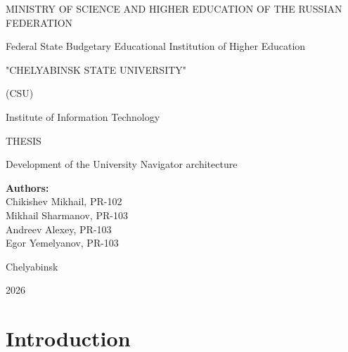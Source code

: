 \documentclass[a4paper, 14pt]{extreport}
\begin{document}
\begin{titlepage}
	\centering
	{MINISTRY OF SCIENCE AND HIGHER EDUCATION OF THE RUSSIAN FEDERATION \par}
	{\normalsize Federal State Budgetary Educational Institution of Higher Education \par}
	{"CHELYABINSK STATE UNIVERSITY" \par}
	(CSU) \par
	\vspace{5pt}
	{\normalsize Institute of Information Technology \par}

	\vspace{80pt}

	{\large THESIS \par}
	\vspace{20pt}

	{\Large Development of the University Navigator architecture \par}

	\vspace{60pt}

	\begin{flushright}
		\begin{minipage}{0.45\textwidth}
			{\bfseries Authors:} \\
			Chikishev Mikhail, PR-102\\
			Mikhail Sharmanov, PR-103\\
			Andreev Alexey, PR-103\\
			Egor Yemelyanov, PR-103
		\end{minipage}
	\end{flushright}

	\vfill

	{\normalsize Chelyabinsk \par}
	{\normalsize 2026 \par}
\end{titlepage}

\setcounter{page}{2}
\tableofcontents
\chapter{Introduction}
\end{document}
